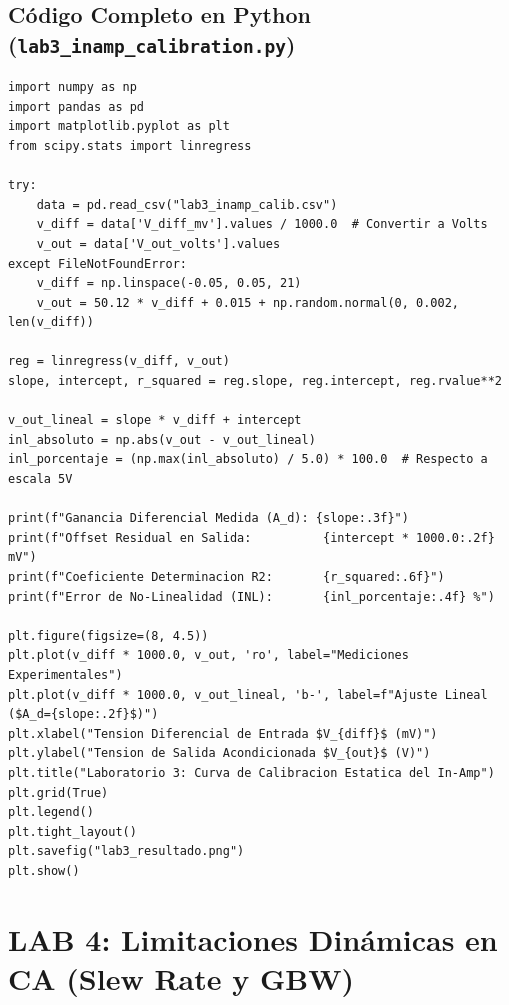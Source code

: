 \documentclass[10pt,a4paper,twoside]{article}
\begin{document}
\subsection{Código Completo en Python (\texttt{lab3\_inamp\_calibration.py})}
\begin{lstlisting}
import numpy as np
import pandas as pd
import matplotlib.pyplot as plt
from scipy.stats import linregress

try:
    data = pd.read_csv("lab3_inamp_calib.csv")
    v_diff = data['V_diff_mv'].values / 1000.0  # Convertir a Volts
    v_out = data['V_out_volts'].values
except FileNotFoundError:
    v_diff = np.linspace(-0.05, 0.05, 21)
    v_out = 50.12 * v_diff + 0.015 + np.random.normal(0, 0.002, len(v_diff))

reg = linregress(v_diff, v_out)
slope, intercept, r_squared = reg.slope, reg.intercept, reg.rvalue**2

v_out_lineal = slope * v_diff + intercept
inl_absoluto = np.abs(v_out - v_out_lineal)
inl_porcentaje = (np.max(inl_absoluto) / 5.0) * 100.0  # Respecto a escala 5V

print(f"Ganancia Diferencial Medida (A_d): {slope:.3f}")
print(f"Offset Residual en Salida:          {intercept * 1000.0:.2f} mV")
print(f"Coeficiente Determinacion R2:       {r_squared:.6f}")
print(f"Error de No-Linealidad (INL):       {inl_porcentaje:.4f} %")

plt.figure(figsize=(8, 4.5))
plt.plot(v_diff * 1000.0, v_out, 'ro', label="Mediciones Experimentales")
plt.plot(v_diff * 1000.0, v_out_lineal, 'b-', label=f"Ajuste Lineal ($A_d={slope:.2f}$)")
plt.xlabel("Tension Diferencial de Entrada $V_{diff}$ (mV)")
plt.ylabel("Tension de Salida Acondicionada $V_{out}$ (V)")
plt.title("Laboratorio 3: Curva de Calibracion Estatica del In-Amp")
plt.grid(True)
plt.legend()
plt.tight_layout()
plt.savefig("lab3_resultado.png")
plt.show()
\end{lstlisting}

\newpage
\section{LAB 4: Limitaciones Dinámicas en CA (Slew Rate y GBW)}
\end{document}

